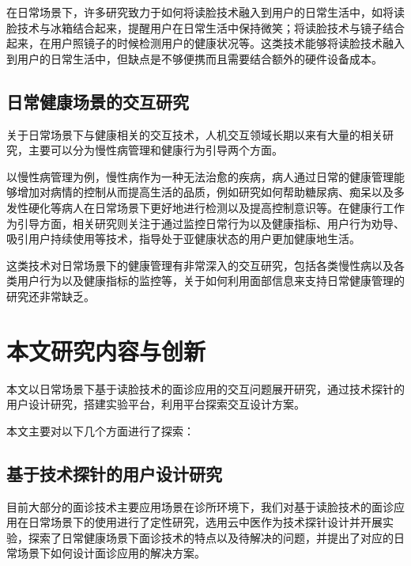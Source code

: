 在日常场景下，许多研究致力于如何将读脸技术融入到用户的日常生活中，如将读脸技术与冰箱结合起来，提醒用户在日常生活中保持微笑\cite{Tsujita2011Smiling}；将读脸技术与镜子结合起来，在用户照镜子的时候检测用户的健康状况\cite{andreu2015mirror}等。这类技术能够将读脸技术融入到用户的日常生活中，但缺点是不够便携而且需要结合额外的硬件设备成本。

\subsection{日常健康场景的交互研究}
关于日常场景下与健康相关的交互技术，人机交互领域长期以来有大量的相关研究，主要可以分为慢性病管理和健康行为引导两个方面。

以慢性病管理为例，慢性病作为一种无法治愈的疾病，病人通过日常的健康管理能够增加对病情的控制从而提高生活的品质，例如研究如何帮助糖尿病\cite{mamykina2008mahi}、痴呆\cite{yasuda2009remote}以及多发性硬化\cite{ayobi2017quantifying}等病人在日常场景下更好地进行检测以及提高控制意识等。在健康行工作为引导方面，相关研究则关注于通过监控日常行为\cite{purpura2011fit4life,Inagawa2013A,bravata2007using,cordeiro2015barriers,lin2006fish, miller2014stepstream}以及健康指标\cite{kay2012lullaby,gronvall2013beyond,logan2007mobile,walters2010a}、用户行为劝导、吸引用户持续使用等技术，指导处于亚健康状态的用户更加健康地生活。

这类技术对日常场景下的健康管理有非常深入的交互研究，包括各类慢性病以及各类用户行为以及健康指标的监控等，关于如何利用面部信息来支持日常健康管理的研究还非常缺乏。

\section{本文研究内容与创新}

本文以日常场景下基于读脸技术的面诊应用的交互问题展开研究，通过技术探针的用户设计研究，搭建实验平台，利用平台探索交互设计方案。

本文主要对以下几个方面进行了探索：

\subsection{基于技术探针的用户设计研究}

目前大部分的面诊技术主要应用场景在诊所环境下，我们对基于读脸技术的面诊应用在日常场景下的使用进行了定性研究，选用云中医作为技术探针设计并开展实验，探索了日常健康场景下面诊技术的特点以及待解决的问题，并提出了对应的日常场景下如何设计面诊应用的解决方案。


